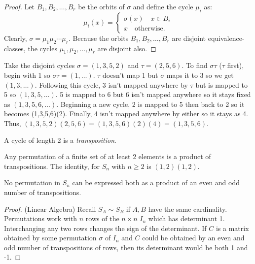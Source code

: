 \begin{proof}
    Let $B_1, B_2, \ldots, B_r$ be the orbits of $\sigma$ and define the cycle $\mu_i$ as: 
    \[
        \mu_i(x) = \begin{cases*}
        \sigma(x) \quad x \in B_i \\
        x \quad \text{otherwise.}
        \end{cases*}
    \]
    Clearly, $\sigma = \mu_1\mu_2\cdots\mu_r$. Because the orbits $B_1, B_2, \ldots, B_r$ are disjoint equivalence-classes, the cycles $\mu_1, \mu_2, \ldots, \mu_r$ are disjoint also.
\end{proof}
\begin{example}
    Take the disjoint cycles $\sigma = (1,3,5,2)$ and $\tau = (2,5,6)$. To find $\sigma\tau$ ($\tau$ first), begin with 1 so $\sigma\tau = (1,\ldots)$. $\tau$ doesn't map 1 but $\sigma$ maps it to 3 so we get $(1,3,\ldots)$. Following this cycle, 3 isn't mapped anywhere by $\tau$ but is mapped to 5 so $(1,3,5,\ldots)$. 5 is mapped to 6 but 6 isn't mapped anywhere so it stays fixed as $(1,3,5,6,\ldots)$. Beginning a new cycle, 2 is mapped to 5 then back to 2 so it becomes (1,3,5,6)(2). Finally, 4 isn't mapped anywhere by either so it stays as 4. Thus, $(1,3,5,2)(2,5,6)=(1,3,5,6)(2)(4)=(1,3,5,6)$.
\end{example}
\begin{definition}[Transposition]
    A cycle of length 2 is a \emph{transposition}.
\end{definition}
\begin{corollary}
    Any permutation of a finite set of at least 2 elements is a product of transpositions. The identity, for $S_n$ with $n\geq 2$ is $(1,2)(1,2)$.
\end{corollary}
\begin{theorem}
    No permutation in $S_n$ can be expressed both as a product of an even and odd number of transpositions.
\end{theorem}
\begin{proof}(Linear Algebra)
    Recall $S_A \sim S_B$ if $A,B$ have the same cardinality. Permutations work with $n$ rows of the $n\times n$ $I_n$ which has determinant 1. Interchanging any two rows changes the sign of the determinant. If $C$ is a matrix obtained by some permutation $\sigma$ of $I_n$ and $C$ could be obtained by an even and odd number of transpositions of rows, then its determinant would be both 1 and -1. 
\end{proof}
